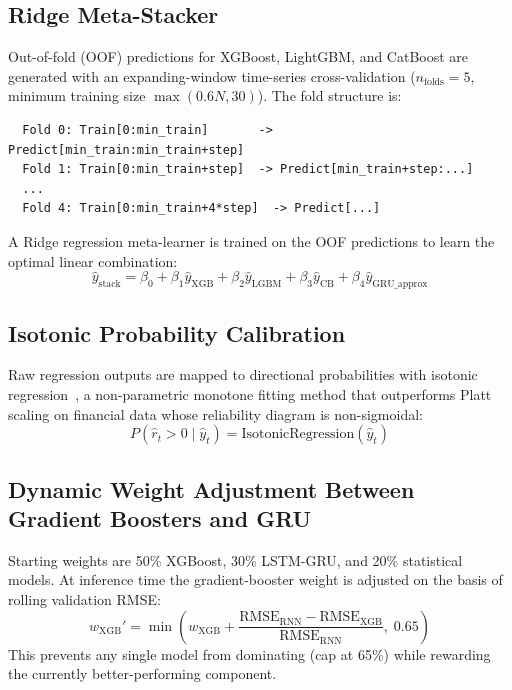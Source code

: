 \documentclass[10pt,a4paper,twoside]{article}
\begin{document}
\subsection{Ridge Meta-Stacker}

Out-of-fold (OOF) predictions for XGBoost, LightGBM, and CatBoost are
generated with an expanding-window time-series cross-validation
($n_{\text{folds}}=5$, minimum training size $\max(0.6N, 30)$). The fold
structure is:
{\small
\begin{verbatim}
  Fold 0: Train[0:min_train]       -> Predict[min_train:min_train+step]
  Fold 1: Train[0:min_train+step]  -> Predict[min_train+step:...]
  ...
  Fold 4: Train[0:min_train+4*step]  -> Predict[...]
\end{verbatim}
}

A Ridge regression meta-learner is trained on the OOF predictions to learn the
optimal linear combination:
\begin{equation}
  \hat{y}_{\text{stack}} = \beta_0 + \beta_1 \hat{y}_{\text{XGB}}
  + \beta_2 \hat{y}_{\text{LGBM}} + \beta_3 \hat{y}_{\text{CB}}
  + \beta_4 \hat{y}_{\text{GRU\_approx}}
\end{equation}

\subsection{Isotonic Probability Calibration}

Raw regression outputs are mapped to directional probabilities with isotonic
regression~\cite{zadrozny2002}, a non-parametric monotone fitting method that
outperforms Platt scaling on financial data whose reliability diagram is
non-sigmoidal:
\begin{equation}
  P(\hat{r}_t > 0 \mid \hat{y}_t) = \text{IsotonicRegression}(\hat{y}_t)
\end{equation}

\subsection{Dynamic Weight Adjustment Between Gradient Boosters and GRU}

Starting weights are 50\% XGBoost, 30\% LSTM-GRU, and 20\% statistical models.
At inference time the gradient-booster weight is adjusted on the basis of
rolling validation RMSE:
\begin{equation}
  w_{\text{XGB}}' = \min\!\left(w_{\text{XGB}}
  + \frac{\text{RMSE}_{\text{RNN}} - \text{RMSE}_{\text{XGB}}}
         {\text{RMSE}_{\text{RNN}}},\; 0.65\right)
\end{equation}
This prevents any single model from dominating (cap at 65\%) while rewarding
the currently better-performing component.
\end{document}
